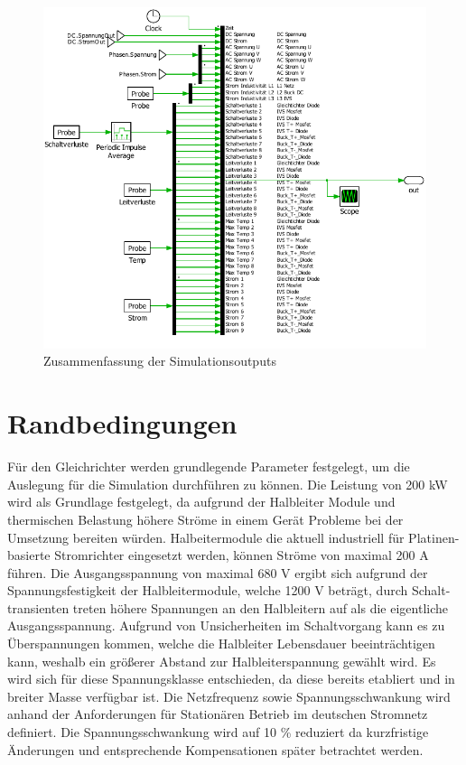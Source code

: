 \begin{figure}
\centering
\includegraphics[width=0.9\linewidth]{content/Grafiken/Plecs_Out}
\caption{Zusammenfassung der Simulationsoutputs}
\label{fig:plecsout}
\end{figure}


\section{Randbedingungen}
Für den Gleichrichter werden grundlegende Parameter festgelegt, um die Auslegung für die Simulation durchführen zu können. Die Leistung von 200 kW wird als Grundlage festgelegt, da aufgrund der Halbleiter Module und thermischen Belastung höhere Ströme in einem Gerät Probleme bei der Umsetzung bereiten würden. Halbeitermodule die aktuell industriell für Platinen-basierte Stromrichter eingesetzt werden, können Ströme von maximal 200 A führen. Die Ausgangsspannung von maximal 680 V ergibt sich aufgrund der Spannungsfestigkeit der Halbleitermodule, welche 1200 V beträgt, durch Schalt-transienten treten höhere Spannungen an den Halbleitern auf als die eigentliche Ausgangsspannung. Aufgrund von Unsicherheiten im Schaltvorgang kann es zu Überspannungen kommen, welche die Halbleiter Lebensdauer beeinträchtigen kann, weshalb ein größerer Abstand zur Halbleiterspannung gewählt wird. Es wird sich für diese Spannungsklasse entschieden, da diese bereits etabliert und in breiter Masse verfügbar ist. Die Netzfrequenz sowie Spannungsschwankung wird anhand der Anforderungen für Stationären Betrieb im deutschen Stromnetz definiert. Die Spannungsschwankung wird auf 10 \% reduziert da kurzfristige Änderungen und entsprechende Kompensationen später betrachtet werden.  \\

